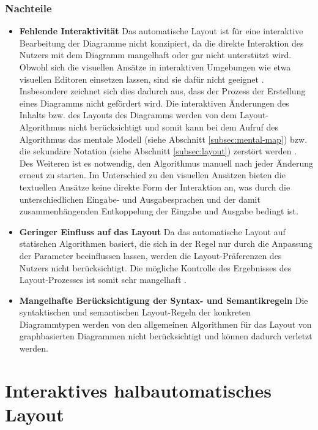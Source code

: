 \subsubsection{Nachteile}

\begin{itemize}
    \item \textbf{Fehlende Interaktivität} Das automatische Layout ist für eine interaktive Bearbeitung der Diagramme nicht konzipiert, da die direkte Interaktion des Nutzers mit dem Diagramm mangelhaft oder gar nicht unterstützt wird. Obwohl sich die visuellen Ansätze in interaktiven Umgebungen wie etwa visuellen Editoren einsetzen lassen, sind sie dafür nicht geeignet \cite[S.22ff]{Maier12A-Pattern-based} \cite[S.4]{DwyerMarriott08Interactive}. Insbesondere zeichnet sich dies dadurch aus, dass der Prozess der Erstellung eines Diagramms nicht gefördert wird. Die interaktiven Änderungen des Inhalts bzw. des Layouts des Diagramms werden von dem Layout-Algorithmus nicht berücksichtigt und somit kann bei dem Aufruf des Algorithmus das mentale Modell (siehe Abschnitt \ref{subsec:mental-map}) bzw. die sekundäre Notation (siehe Abschnitt \ref{subsec:layout}) zerstört werden \cite{Eiglsperger04Automatic}. Des Weiteren ist es notwendig, den Algorithmus manuell nach jeder Änderung erneut zu starten. Im Unterschied zu den visuellen Ansätzen bieten die textuellen Ansätze keine direkte Form der Interaktion an, was durch die unterschiedlichen Eingabe- und Ausgabesprachen und der damit zusammenhängenden Entkoppelung der Eingabe und Ausgabe bedingt ist.
    \item \textbf{Geringer Einfluss auf das Layout} Da das automatische Layout auf statischen Algorithmen basiert, die sich in der Regel nur durch die Anpassung der Parameter beeinflussen lassen, werden die Layout-Präferenzen des Nutzers nicht berücksichtigt. Die mögliche Kontrolle des Ergebnisses des Layout-Prozesses ist somit sehr mangelhaft \cite[S.382]{GladischSchumann14Semi-Automatic}.
    \item \textbf{Mangelhafte Berücksichtigung der Syntax- und Semantikregeln} Die syntaktischen und semantischen Layout-Regeln der konkreten Diagrammtypen werden von den allgemeinen Algorithmen für das Layout von graphbasierten Diagrammen nicht berücksichtigt und können dadurch verletzt werden.
\end{itemize}

\section{Interaktives halbautomatisches Layout}
\label{sec:interactive-semi-automatic-layout}

